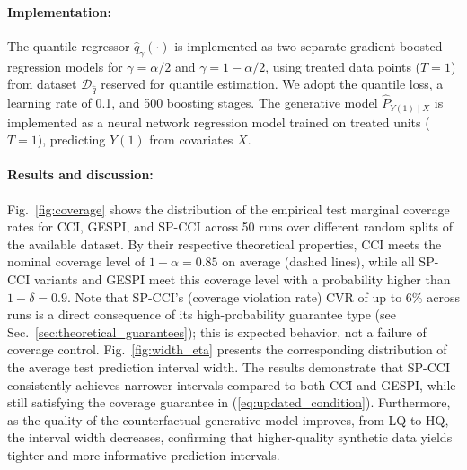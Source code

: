 \documentclass{article}
\theoremstyle{plain}
\theoremstyle{definition}
\theoremstyle{remark}
\begin{document}
\paragraph{Implementation:} The quantile regressor $\hat{q}_\gamma(\cdot)$ is implemented as two separate gradient-boosted regression models \citep{friedman2001greedy} for $\gamma = \alpha/2$ and $\gamma = 1 - \alpha/2$, using treated data points ($T = 1$) from dataset \(\mathcal{D}_{\hat{q}}\) reserved for quantile estimation. We adopt the quantile loss, a learning rate of 0.1, and 500 boosting stages. The generative model $\hat{P}_{Y(1)\mid X}$ is implemented as a neural network regression model trained on treated units ($T=1$), predicting $Y(1)$ from covariates $X$.



\paragraph{Results and discussion:} Fig.~\ref{fig:coverage} shows the distribution of the empirical test marginal coverage rates for CCI, GESPI, and SP-CCI across 50 runs over different random splits of the available dataset. By their respective theoretical properties, CCI meets the nominal coverage level of $1 - \alpha = 0.85$ on average (dashed lines), while all SP-CCI variants and GESPI meet this coverage level with a probability higher than $1-\delta = 0.9$. Note that SP-CCI's (coverage violation rate) CVR of up to 6\% across runs is a direct consequence of its high-probability guarantee type (see Sec.~\ref{sec:theoretical_guarantees}); this is expected behavior, not a failure of coverage control. Fig.~\ref{fig:width_eta} presents the corresponding distribution of the average test prediction interval width. The results demonstrate that SP-CCI consistently achieves narrower intervals compared to both CCI and GESPI, while still satisfying the coverage guarantee in (\ref{eq:updated_condition}). Furthermore, as the quality of the counterfactual generative model improves, from LQ to HQ, the interval width decreases, confirming that higher-quality synthetic data yields tighter and more informative prediction intervals.
\end{document}
